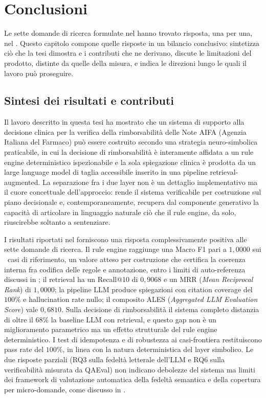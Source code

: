 \chapter{Conclusioni}
\label{ch:conclusioni}

Le sette domande di ricerca formulate nel  hanno trovato
risposta, una per una, nel . Questo capitolo compone
quelle risposte in un bilancio conclusivo: sintetizza ciò che la tesi
dimostra e i contributi che ne derivano, discute le limitazioni del
prodotto, distinte da quelle della misura, e indica le direzioni lungo le
quali il lavoro può proseguire.

\section{Sintesi dei risultati e contributi}
\label{sec:concl-sintesi}

Il lavoro descritto in questa tesi ha mostrato che un sistema di supporto alla decisione clinica per la verifica della rimborsabilità delle Note AIFA (Agenzia Italiana del Farmaco) può essere costruito secondo una strategia neuro-simbolica praticabile, in cui la decisione di rimborsabilità è interamente affidata a un rule engine deterministico ispezionabile e la sola spiegazione clinica è prodotta da un large language model di taglia accessibile inserito in una pipeline retrieval-augmented. La separazione fra i due layer non è un dettaglio implementativo ma il cuore concettuale dell'approccio: rende il sistema verificabile per costruzione sul piano decisionale e, contemporaneamente, recupera dal componente generativo la capacità di articolare in linguaggio naturale ciò che il rule engine, da solo, riuscirebbe soltanto a sentenziare.

I risultati riportati nel  forniscono una risposta complessivamente positiva alle sette domande di ricerca. Il rule engine raggiunge una Macro F1 pari a $1{,}0000$ sui \goldn\ casi di riferimento, un valore atteso per costruzione che certifica la coerenza interna fra codifica delle regole e annotazione, entro i limiti di auto-referenza discussi in ; il retrieval ha un Recall@10 di $0{,}9068$ e un MRR (\emph{Mean Reciprocal Rank}) di $1{,}0000$; la pipeline LLM produce spiegazioni con citation coverage del $100\%$ e hallucination rate nullo; il composito ALES (\emph{Aggregated LLM Evaluation Score}) vale $0{,}6810$. Sulla decisione di rimborsabilità il sistema completo distanzia di oltre il $68\%$ la baseline LLM con retrieval, e questo gap non è un miglioramento parametrico ma un effetto strutturale del rule engine deterministico. I test di idempotenza e di robustezza ai casi-frontiera restituiscono pass rate del $100\%$, in linea con la natura deterministica del layer simbolico. Le due risposte parziali (RQ3 sulla fedeltà letterale dell'LLM e RQ6 sulla verificabilità misurata da QAEval) non indicano debolezze del sistema ma limiti dei framework di valutazione automatica della fedeltà semantica e della copertura per micro-domande, come discusso in .

